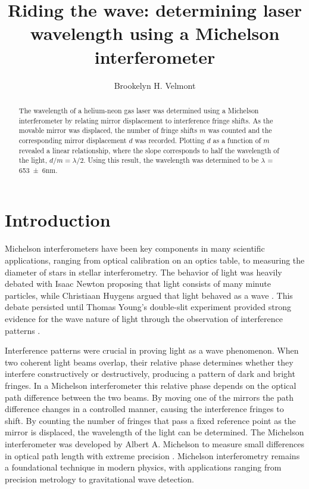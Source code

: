 \documentclass[rc]{physicsinprogress}
\begin{document}
\title{Riding the wave: determining laser wavelength using a Michelson interferometer}
\author{Brookelyn H. Velmont}
%
\begin{abstract}
 The wavelength of a helium-neon gas laser was determined using a Michelson interferometer by relating mirror displacement to interference fringe shifts. As the movable mirror was displaced, the number of fringe shifts $m$ was counted and the corresponding mirror displacement $d$ was recorded. Plotting $d$ as a function of $m$ revealed a linear relationship, where the slope corresponds to half the wavelength of the light, $d/m = \lambda/2$. Using this result, the wavelength was determined to be $\lambda$ = \num{653 \pm 6}nm.
\end{abstract}

\maketitle

\section{Introduction}
Michelson interferometers have been key components in many scientific applications, ranging from optical calibration on an optics table, to measuring the diameter of stars in stellar interferometry. The behavior of light was heavily debated with Isaac Newton proposing that light consists of many minute particles, while Christiaan Huygens argued that light behaved as a wave \cite{crew1900wave}. This debate persisted until Thomas Young's double-slit experiment provided strong evidence for the wave nature of light through the observation of interference patterns \cite{young1804bakerian}.

Interference patterns were crucial in proving light as a wave phenomenon. When two coherent light beams overlap, their relative phase determines whether they interfere constructively or destructively, producing a pattern of dark and bright fringes. In a Michelson interferometer this relative phase depends on the optical path difference between the two beams. By moving one of the mirrors the path difference changes in a controlled manner, causing the interference fringes to shift. By counting the number of fringes that pass a fixed reference point as the mirror is displaced, the wavelength of the light can be determined. The Michelson interferometer was developed by Albert A. Michelson to measure small differences in optical path length with extreme precision \cite{michelson1887art}. Michelson interferometry remains a foundational technique in modern physics, with applications ranging from precision metrology to gravitational wave detection.
\end{document}
